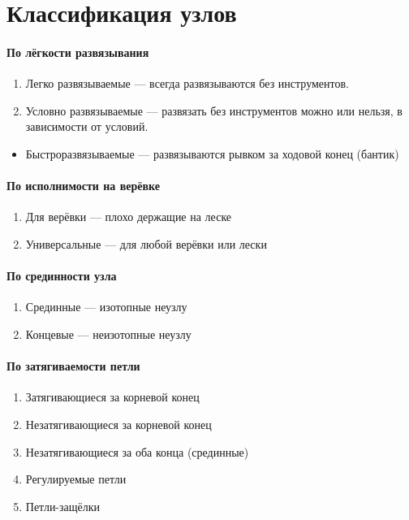 \section{Классификация узлов}

\paragraph{По лёгкости развязывания}
\begin{enumerate}
\item Легко развязываемые --- всегда развязываются без инструментов.
\item Условно развязываемые --- развязать без инструментов можно или нельзя, в зависимости от условий.
\end{enumerate}

\begin{itemize}
\item Быстроразвязываемые --- развязываются рывком за ходовой конец (бантик)
\end{itemize}


\paragraph{По исполнимости на верёвке}
\begin{enumerate}
\item Для верёвки --- плохо держащие на леске
\item Универсальные --- для любой верёвки или лески
\end{enumerate}

\paragraph{По срединности узла}
\begin{enumerate}
\item Срединные --- изотопные неузлу
\item Концевые --- неизотопные неузлу
\end{enumerate}

\paragraph{По затягиваемости петли}
\begin{enumerate}
\item Затягивающиеся за корневой конец
\item Незатягивающиеся за корневой конец
\item Незатягивающиеся за оба конца (срединные)
\item Регулируемые петли
\item Петли-защёлки
\end{enumerate}


